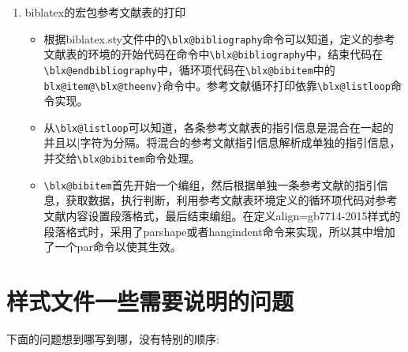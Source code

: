 \begin{enumerate}
  \item biblatex的宏包参考文献表的打印
  \begin{itemize}
  \item 根据biblatex.sty文件中的\verb|\blx@bibliography|命令可以知道，定义的参考文献表的环境的开始代码在命令中\verb|\blx@bibliography|中，结束代码在\verb|\blx@endbibliography|中，循环项代码在\verb|\blx@bibitem|中的\verb|blx@item@\blx@theenv}|命令中。参考文献循环打印依靠\verb|\blx@listloop|命令实现。
  \item 从\verb|\blx@listloop|可以知道，各条参考文献表的指引信息是混合在一起的并且以|字符为分隔。将混合的参考文献指引信息解析成单独的指引信息，并交给\verb|\blx@bibitem|命令处理。
  \item \verb|\blx@bibitem|首先开始一个编组，然后根据单独一条参考文献的指引信息，获取数据，执行判断，利用参考文献表环境定义的循环项代码对参考文献内容设置段落格式，最后结束编组。在定义align=gb7714-2015样式的段落格式时，采用了parshape或者hangindent命令来实现，所以其中增加了一个par命令以使其生效。
  \end{itemize}

\end{enumerate}

\section{样式文件一些需要说明的问题}
下面的问题想到哪写到哪，没有特别的顺序:

